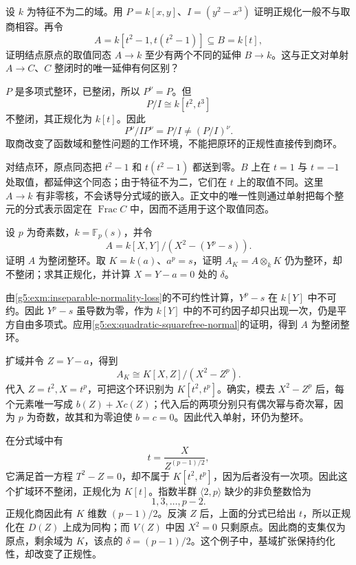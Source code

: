 \begin{exercise}\label{g5:ex:normalization-quotient-and-lifts}
	设 \(k\) 为特征不为二的域。用 \(P=k[x,y]\)、\(I=(y^2-x^3)\) 证明正规化一般不与取商相容。再令
	\[
		A=k[t^2-1,t(t^2-1)]\subseteq B=k[t],
	\]
	证明结点原点的取值同态 \(A\to k\) 至少有两个不同的延伸 \(B\to k\)。这与正文对单射 \(A\to C\)、\(C\) 整闭时的唯一延伸有何区别？
\end{exercise}
\begin{solution}
	\(P\) 是多项式整环，已整闭，所以 \(P^\nu=P\)。但
	\[
		P/I\cong k[t^2,t^3]
	\]
	不整闭，其正规化为 \(k[t]\)。因此
	\[
		P^\nu/IP^\nu=P/I\ne(P/I)^\nu.
	\]
	取商改变了函数域和整性问题的工作环境，不能把原环的正规性直接传到商环。

	对结点环，原点同态把 \(t^2-1\) 和 \(t(t^2-1)\) 都送到零。\(B\) 上在 \(t=1\) 与 \(t=-1\) 处取值，都延伸这个同态；由于特征不为二，它们在 \(t\) 上的取值不同。这里 \(A\to k\) 有非零核，不会诱导分式域的嵌入。正文中的唯一性则通过单射把每个整元的分式表示固定在 \(\operatorname{Frac}C\) 中，因而不适用于这个取值同态。
\end{solution}

\begin{exercise}\label{g5:ex:geometrically-nonnormal-reduced}
	设 \(p\) 为奇素数，\(k=\mathbb F_p(s)\)，并令
	\[
		A=k[X,Y]/(X^2-(Y^p-s)).
	\]
	证明 \(A\) 为整闭整环。取 \(K=k(a)\)、\(a^p=s\)，证明 \(A_K=A\otimes_kK\) 仍为整环，却不整闭；求其正规化，并计算 \(X=Y-a=0\) 处的 \(\delta\)。
\end{exercise}
\begin{solution}
	由\cref{g5:exm:inseparable-normality-loss}的不可约性计算，\(Y^p-s\) 在 \(k[Y]\) 中不可约。因此 \(Y^p-s\) 虽导数为零，作为 \(k[Y]\) 中的不可约因子却只出现一次，仍是平方自由多项式。应用\cref{g5:ex:quadratic-squarefree-normal}的证明，得到 \(A\) 为整闭整环。

	扩域并令 \(Z=Y-a\)，得到
	\[
		A_K\cong K[X,Z]/(X^2-Z^p).
	\]
	代入 \(Z=t^2,X=t^p\)，可把这个环识别为 \(K[t^2,t^p]\)。确实，模去 \(X^2-Z^p\) 后，每个元素唯一写成 \(b(Z)+Xc(Z)\)；代入后的两项分别只有偶次幂与奇次幂，因为 \(p\) 为奇数，故其和为零迫使 \(b=c=0\)。因此代入单射，环仍为整环。

	在分式域中有
	\[
		t=\frac{X}{Z^{(p-1)/2}},
	\]
	它满足首一方程 \(T^2-Z=0\)，却不属于 \(K[t^2,t^p]\)，因为后者没有一次项。因此这个扩域环不整闭，正规化为 \(K[t]\)。指数半群 \(\langle2,p\rangle\) 缺少的非负整数恰为
	\[
		1,3,\ldots,p-2.
	\]
	正规化商因此有 \(K\) 维数 \((p-1)/2\)。反演 \(Z\) 后，上面的分式已给出 \(t\)，所以正规化在 \(D(Z)\) 上成为同构；而 \(V(Z)\) 中因 \(X^2=0\) 只剩原点。因此商的支集仅为原点，剩余域为 \(K\)，该点的 \(\delta=(p-1)/2\)。这个例子中，基域扩张保持约化性，却改变了正规性。
\end{solution}

